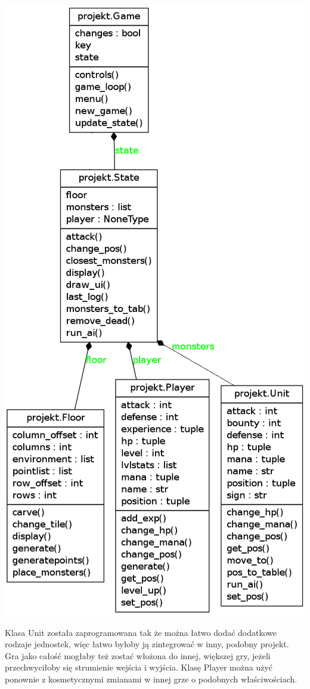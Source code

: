 \documentclass{beamer}
\begin{document}
\begin{landscape}
\begin{frame}
\centerline{\includegraphics[width=\textwidth,height=\textheight,keepaspectratio]{classes_test.png}}
\end{frame}
\end{landscape}
\begin{frame}
Klasa Unit została zaprogramowana tak że można łatwo dodać dodatkowe rodzaje jednostek, więc łatwo byłoby ją zintegrować w inny, podobny projekt. Gra jako całość mogłaby też zostać włożona do innej, większej gry, jeżeli przechwyciłoby się strumienie wejścia i wyjścia. Klasę Player można użyć ponownie z kosmetycznymi zmianami w innej grze o podobnych właściwościach.
\end{frame}
\end{document}
